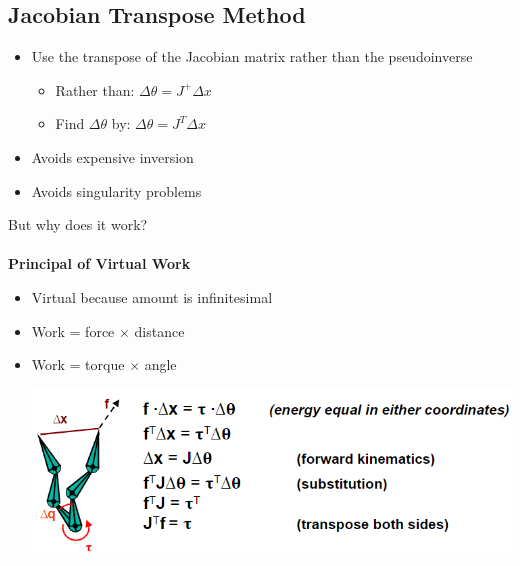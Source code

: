 \documentclass{article}
\begin{document}
\subsection*{Jacobian Transpose Method}
\begin{itemize}
    \item Use the transpose of the Jacobian matrix rather than the pseudoinverse
    \begin{itemize}
        \item Rather than: $\Delta \theta = J^+ \Delta x$
        \item Find $\Delta \theta$ by: $\Delta \theta = J^T \Delta x$
    \end{itemize}
    \item Avoids expensive inversion
    \item Avoids singularity problems
\end{itemize}
But why does it work?\\\\

\textbf{Principal of Virtual Work}
\begin{itemize}
    \item Virtual because amount is infinitesimal
    \item Work = force $\times$ distance
    \item Work = torque $\times$ angle
    \begin{center}
        \includegraphics*[scale=0.9]{W7_18.png}
    \end{center}
\end{itemize}
\end{document}
